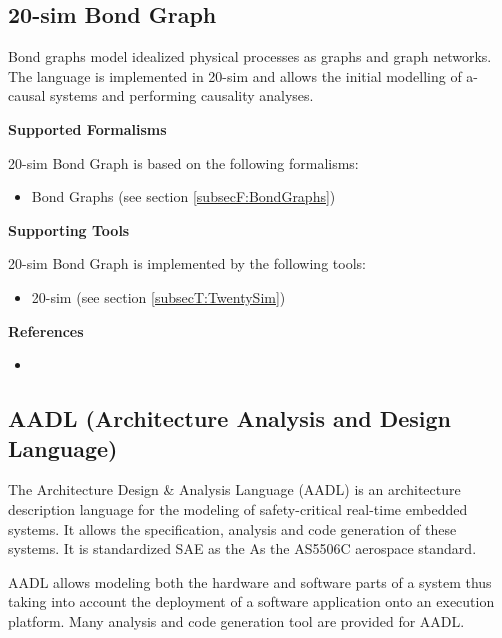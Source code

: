 \subsection{20-sim Bond Graph}
\label{subsecL:TwentySimBondGraph}


Bond graphs model idealized physical processes as graphs and graph networks. The language is implemented in 20-sim and allows the initial modelling of a-causal systems and performing causality analyses.

\textbf{Supported Formalisms}

20-sim Bond Graph is based on the following formalisms:
\begin{itemize}
	\item Bond Graphs (see section \ref{subsecF:BondGraphs})
\end{itemize}


\textbf{Supporting Tools}

20-sim Bond Graph is implemented by the following tools:
\begin{itemize}
	\item 20-sim (see section \ref{subsecT:TwentySim})
\end{itemize}


\textbf{References}
\begin{itemize}
	
\item {}
\end{itemize}



\subsection{AADL (Architecture Analysis and Design Language)}
\label{subsecL:AADL}


The Architecture Design \& Analysis Language (AADL) is an architecture description language for the modeling of safety-critical real-time embedded systems. It allows the specification, analysis and code generation of these systems. It is standardized SAE as the As the AS5506C aerospace standard.

AADL allows modeling both the hardware and software parts of a system thus taking into account the deployment of a software application onto an execution platform. Many analysis and code generation tool are provided for AADL.

